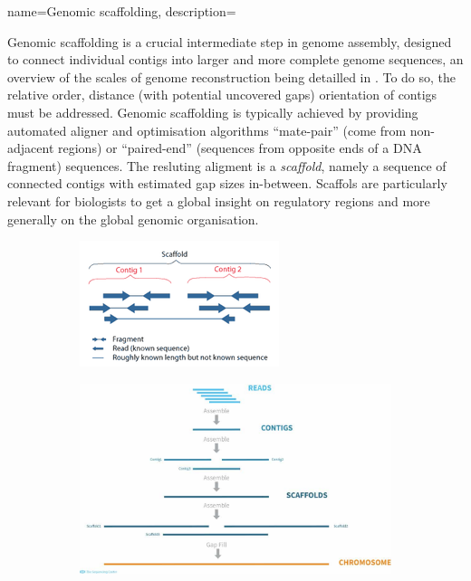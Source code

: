 {name=Genomic scaffolding, 
description={Genomic scaffolding is a crucial intermediate step in genome assembly,
designed to connect individual \glspl{contig} into larger and more complete genome sequences,
 an overview of the scales of genome reconstruction being detailled in .
To do so, the relative order, distance (with potential uncovered gaps) orientation of contigs must be addressed.
Genomic scaffolding is typically achieved by providing automated aligner and optimisation algorithms
 \enquote{mate-pair} (come from non-adjacent regions) or \enquote{paired-end} (sequences from opposite ends of a DNA fragment) sequences. 
 The resluting aligment is a \emph{scaffold}, namely a sequence of connected contigs with estimated gap sizes in-between. Scaffols are particularly relevant for 
biologists to get a global insight on regulatory regions and more generally on the global genomic organisation.
\begin{figure}
     \centering
     \begin{subfigure}[p]{0.4\textwidth}
         \centering
         \includegraphics[width=\textwidth]{figures/biological_introduction/contig1.png}
     \end{subfigure}
     \hfill
     \begin{subfigure}[p]{0.4\textwidth}
         \centering
         \includegraphics[width=\textwidth]{figures/biological_introduction/contig2.jpg}

\end{subfigure}
\end{figure}}}
